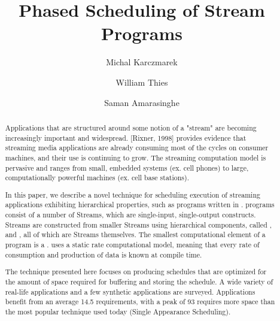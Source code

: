 \documentclass[runningheads]{llncs}
\begin{document}
\pagestyle{headings}

\mainmatter

\title{Phased Scheduling of Stream Programs}
\author{Michal Karczmarek \and William Thies \and Saman
Amarasinghe}


\maketitle



\begin{abstract}
Applications that are structured around some notion of a "stream"
are becoming increasingly important and widespread.  [Rixner,
1998] provides evidence that streaming media applications are
already consuming most of the cycles on consumer machines, and
their use is continuing to grow. The streaming computation model
is pervasive and ranges from small, embedded systems (ex. cell
phones) to large, computationally powerful machines (ex. cell base
stations).

In this paper, we describe a novel technique for scheduling
execution of streaming applications exhibiting hierarchical
properties, such as programs written in \StreamIt. \StreamIt
programs consist of a number of Streams, which are single-input,
single-output constructs. Streams are constructed from smaller
Streams using hierarchical components, called \pipeline,
\splitjoin and \feedbackloop, all of which are Streams themselves.
The smallest computational element of a \StreamIt program is a
\filter. \StreamIt uses a static rate computational model, meaning
that every \filters rate of consumption and production of data is
known at compile time.

The technique presented here focuses on producing schedules that
are optimized for the amount of space required for buffering and
storing the schedule. A wide variety of real-life applications and
a few synthetic applications are
surveyed. Applications benefit from an average 14.5%
requirements, with a peak of 93%
requires more space than the most popular technique used today
(Single Appearance Scheduling).
\end{abstract}

%
%

%








%

\appendix





\end{document}
